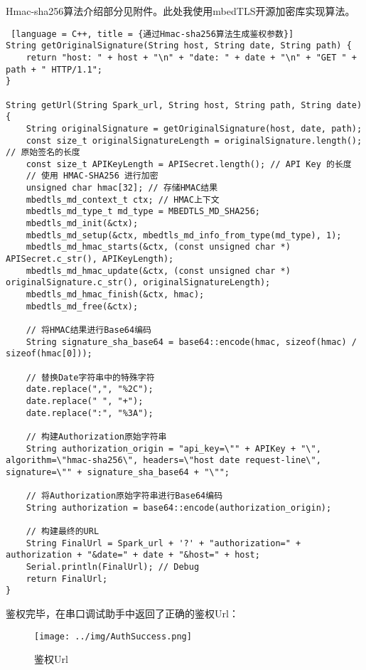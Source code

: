 Hmac-sha256算法介绍部分见附件。此处我使用mbedTLS开源加密库实现算法。

\begin{lstlisting} [language = C++, title = {通过Hmac-sha256算法生成鉴权参数}]
String getOriginalSignature(String host, String date, String path) {
    return "host: " + host + "\n" + "date: " + date + "\n" + "GET " + path + " HTTP/1.1";
}

String getUrl(String Spark_url, String host, String path, String date) {
    String originalSignature = getOriginalSignature(host, date, path);
    const size_t originalSignatureLength = originalSignature.length(); // 原始签名的长度
    const size_t APIKeyLength = APISecret.length(); // API Key 的长度
    // 使用 HMAC-SHA256 进行加密
    unsigned char hmac[32]; // 存储HMAC结果
    mbedtls_md_context_t ctx; // HMAC上下文
    mbedtls_md_type_t md_type = MBEDTLS_MD_SHA256;
    mbedtls_md_init(&ctx);
    mbedtls_md_setup(&ctx, mbedtls_md_info_from_type(md_type), 1);
    mbedtls_md_hmac_starts(&ctx, (const unsigned char *) APISecret.c_str(), APIKeyLength);
    mbedtls_md_hmac_update(&ctx, (const unsigned char *) originalSignature.c_str(), originalSignatureLength);
    mbedtls_md_hmac_finish(&ctx, hmac);
    mbedtls_md_free(&ctx);

    // 将HMAC结果进行Base64编码
    String signature_sha_base64 = base64::encode(hmac, sizeof(hmac) / sizeof(hmac[0]));

    // 替换Date字符串中的特殊字符
    date.replace(",", "%2C");
    date.replace(" ", "+");
    date.replace(":", "%3A");

    // 构建Authorization原始字符串
    String authorization_origin = "api_key=\"" + APIKey + "\", algorithm=\"hmac-sha256\", headers=\"host date request-line\", signature=\"" + signature_sha_base64 + "\"";

    // 将Authorization原始字符串进行Base64编码
    String authorization = base64::encode(authorization_origin);

    // 构建最终的URL
    String FinalUrl = Spark_url + '?' + "authorization=" + authorization + "&date=" + date + "&host=" + host;
    Serial.println(FinalUrl); // Debug
    return FinalUrl;
}
\end{lstlisting}

鉴权完毕，在串口调试助手中返回了正确的鉴权Url：

\begin{figure} [H]
    \centering
    \texttt{[image: ../img/AuthSuccess.png]}
    \caption{鉴权Url}
    \label{fig:AuthorizationUrl}
\end{figure}

